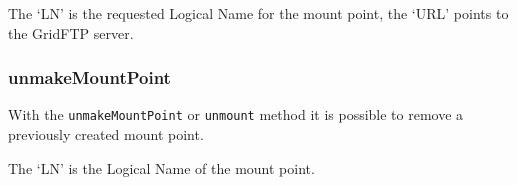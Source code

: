 The `LN' is the requested Logical Name for the mount point, the `URL' points to the GridFTP server.

\subsubsection{unmakeMountPoint} %
\label{ssub:unmakemountpoint}
With the \texttt{unmakeMountPoint} or \texttt{unmount} method it is possible to remove a previously created mount point.
\hspace*{0.5cm}
\begin{shaded}
\end{shaded}

The `LN' is the Logical Name of the mount point.
